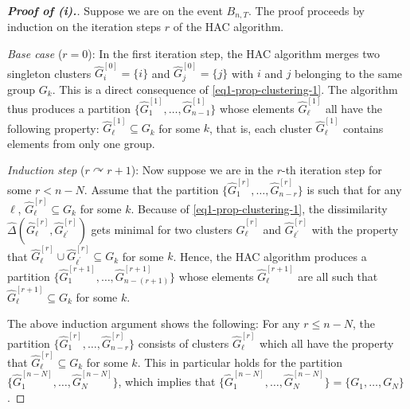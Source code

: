 \documentclass[a4paper,12pt]{article}
\begin{document}
\begin{proof}[\textnormal{\textbf{Proof of (i).}}]
Suppose we are on the event $B_{n,T}$. The proof proceeds by induction on the iteration steps $r$ of the HAC algorithm. 
\vspace{7pt}

\textit{Base case} ($r=0$): In the first iteration step, the HAC algorithm merges two singleton clusters $\widehat{G}_i^{[0]} = \{ i \}$ and $\widehat{G}_j^{[0]} = \{ j \}$ with $i$ and $j$ belonging to the same group $G_k$. This is a direct consequence of \eqref{eq1-prop-clustering-1}. The algorithm thus produces a partition $\{ \widehat{G}_1^{[1]},\ldots,\widehat{G}_{n-1}^{[1]} \}$ whose elements $\widehat{G}_\ell^{[1]}$ all have the following property: $\widehat{G}_\ell^{[1]} \subseteq G_k$ for some $k$, that is, each cluster $\widehat{G}_\ell^{[1]}$ contains elements from only one group. 
\vspace{7pt}

\textit{Induction step} ($r \curvearrowright r+1$): Now suppose we are in the $r$-th iteration step for some $r < n-N$. Assume that the partition $\{\widehat{G}_1^{[r]},\ldots,\widehat{G}_{n-r}^{[r]}\}$ is such that for any $\ell$, $\widehat{G}_\ell^{[r]} \subseteq G_k$ for some $k$. Because of \eqref{eq1-prop-clustering-1}, the dissimilarity $\widehat{\Delta}(\widehat{G}_\ell^{[r]},\widehat{G}_{\ell^\prime}^{[r]})$ gets minimal for two clusters $\widehat{G}_\ell^{[r]}$ and $\widehat{G}_{\ell^\prime}^{[r]}$ with the property that $\widehat{G}_\ell^{[r]} \cup \widehat{G}_{\ell^\prime}^{[r]} \subseteq G_k$ for some $k$. Hence, the HAC algorithm produces a partition $\{ \widehat{G}_1^{[r+1]},\ldots,\widehat{G}_{n-(r+1)}^{[r+1]} \}$ whose elements $\widehat{G}_\ell^{[r+1]}$ are all such that $\widehat{G}_\ell^{[r+1]} \subseteq G_k$ for some $k$. 
\vspace{7pt}

The above induction argument shows the following: For any $r \le n - N$, the partition $\{ \widehat{G}_1^{[r]},\ldots,\widehat{G}_{n-r}^{[r]} \}$ consists of clusters $\widehat{G}_\ell^{[r]}$ which all have the property that $\widehat{G}_\ell^{[r]} \subseteq G_k$ for some $k$. This in particular holds for the partition $\{ \widehat{G}_1^{[n-N]},\ldots,\widehat{G}_N^{[n-N]} \}$, which implies that $\{ \widehat{G}_1^{[n-N]},\ldots,\widehat{G}_N^{[n-N]} \} =\{ G_1,\ldots,G_N \}$.  
\end{proof}
\end{document}
